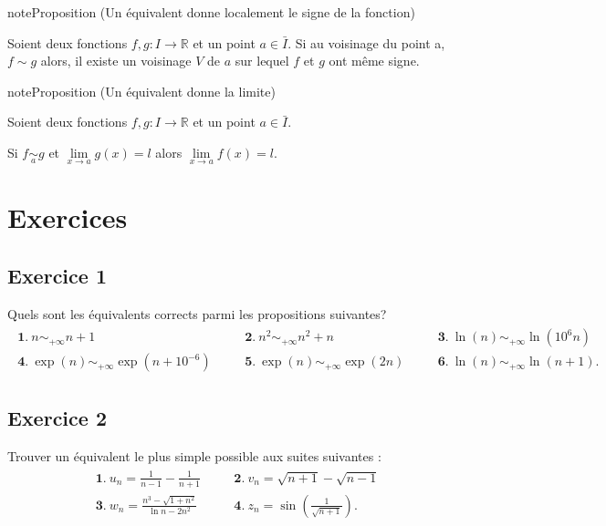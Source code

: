 \documentclass[letterpaper,10pt,french]{jupyterBook}
\begin{document}
\begin{sphinxadmonition}{note}{Proposition (Un équivalent donne localement le signe de la fonction)}

\sphinxAtStartPar
Soient deux fonctions \(f, g : I \to \mathbb{R}\) et un point \(a \in \bar{I}\).
Si au voisinage du point a, \(f \sim g\) alors, il existe un voisinage \(V\) de \(a\) sur lequel \(f\) et \(g\) ont même signe.
\end{sphinxadmonition}

\begin{sphinxadmonition}{note}{Proposition (Un équivalent donne la limite)}

\sphinxAtStartPar
Soient deux fonctions \(f, g : I \to \mathbb{R}\) et un point \(a \in \bar{I}\).

\sphinxAtStartPar
Si \(f\underset{a}{\sim} g\) et \(\underset{x\to a}{\lim} g(x) = l\) alors \(\underset{x\to a}{\lim} f(x) = l\).
\end{sphinxadmonition}


\section{Exercices}
\label{\detokenize{exo6:exercices}}\label{\detokenize{exo6::doc}}

\subsection{Exercice 1}
\label{\detokenize{exo6:exercice-1}}
\sphinxAtStartPar
Quels sont les équivalents corrects parmi les propositions suivantes?
\begin{equation*}
\begin{split}\begin{array}{lllll}
 \mathbf 1.\ n\sim_{+\infty}n+1&\quad&\mathbf 2.\ n^2\sim_{+\infty}n^2+n&\quad&\mathbf 3.\ \ln(n)\sim_{+\infty}\ln(10^6 n)\\
 \mathbf 4.\ \exp(n)\sim_{+\infty}\exp\left(n+10^{-6}\right)&\quad&\mathbf 5.\ \exp(n)\sim_{+\infty}\exp(2n)&\quad&\mathbf 6.\ \ln(n)\sim_{+\infty}\ln(n+1).
\end{array}
\end{split}
\end{equation*}

\subsection{Exercice 2}
\label{\detokenize{exo6:exercice-2}}
\sphinxAtStartPar
Trouver un équivalent le plus simple possible aux suites suivantes :
\begin{equation*}
\begin{split}
\begin{array}{lll}
\mathbf 1.\ u_n=\frac{1}{n-1}-\frac{1}{n+1}&\quad&\mathbf 2.\ v_n=\sqrt{n+1}-\sqrt{n-1}\\
\mathbf 3.\ w_n=\frac{n^3-\sqrt{1+n^2}}{\ln n-2n^2}&\quad&\mathbf 4.\ z_n=\sin\left(\frac1{\sqrt{n+1}}\right).
\end{array}
\end{split}
\end{equation*}
\end{document}
